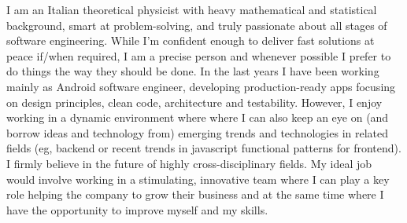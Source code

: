 
\begin{cvparagraph}
I am an Italian theoretical physicist with heavy mathematical and statistical 
background, smart at problem-solving, and truly passionate about all stages of software engineering. 
While 
I'm confident enough to
deliver 
fast solutions at peace
if/when
required, 
I am a precise person and whenever possible I prefer to do things the way they
should be done.
In the last years I have been working mainly as Android software engineer,  developing production-ready apps 
	focusing on design principles, clean code, architecture and testability.
 However, I enjoy  working in a dynamic
environment where 
 where I can also keep an eye on (and borrow ideas and technology from) emerging trends and technologies in related
fields (eg, backend or recent trends in javascript functional patterns for frontend). 
 I firmly
believe in the future of highly cross-disciplinary fields.
My ideal job would involve working in a stimulating, innovative team where I
can play a key role helping the company to grow their business and at the same time
where I have the opportunity to improve myself and my skills.
\end{cvparagraph}
